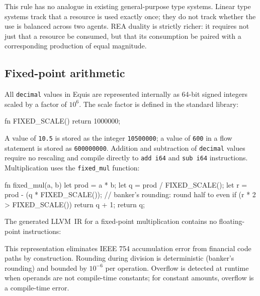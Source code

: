 \documentclass[11pt,a4paper]{article}
\theoremstyle{remark}
\begin{document}
This rule has no analogue in existing general-purpose type systems.
Linear type systems \citep{bernardy_linear_2017} track that a resource is
used exactly once; they do not track whether the use is balanced across
two agents. REA duality is strictly richer: it requires not just that a
resource be consumed, but that its consumption be paired with a
corresponding production of equal magnitude.

\subsection{Fixed-point arithmetic}\label{sec:design:fixed}

All \texttt{decimal} values in Equis are represented internally as
64-bit signed integers scaled by a factor of $10^{6}$. The scale factor
is defined in the standard library:

\begin{equiscode}
fn FIXED_SCALE() { return 1000000; }
\end{equiscode}

A value of \texttt{10.5} is stored as the integer \texttt{10500000}; a
value of \texttt{600} in a flow statement is stored as
\texttt{600000000}. Addition and subtraction of \texttt{decimal} values
require no rescaling and compile directly to \texttt{add i64} and
\texttt{sub i64} instructions. Multiplication uses the
\texttt{fixed\_mul} function:

\begin{equiscode}
fn fixed_mul(a, b) {
    let prod = a * b;
    let q    = prod / FIXED_SCALE();
    let r    = prod - (q * FIXED_SCALE());
    // banker's rounding: round half to even
    if (r * 2 > FIXED_SCALE()) { return q + 1; }
    return q;
}
\end{equiscode}

The generated LLVM~IR for a fixed-point multiplication contains no
floating-point instructions:


This representation eliminates IEEE 754 accumulation error
\citep{goldberg_what_1991} from financial code paths by construction.
Rounding during division is deterministic (banker's rounding) and
bounded by $10^{-6}$ per operation. Overflow is detected at runtime when
operands are not compile-time constants; for constant amounts, overflow
is a compile-time error.
\end{document}
